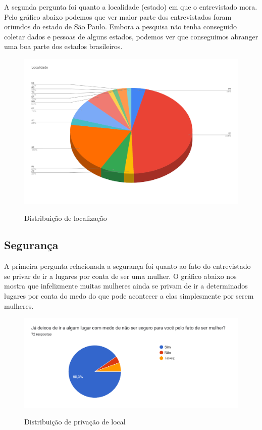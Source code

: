 A segunda pergunta foi quanto a localidade (estado) em que o entrevistado mora. Pelo gráfico abaixo podemos que ver maior parte dos entrevistados foram oriundos do estado de São Paulo. Embora a pesquisa não tenha conseguido coletar dados e pessoas de alguns estados, podemos ver que conseguimos abranger uma boa parte dos estados brasileiros.

\begin{figure}[htbp]
  \begin{center}
  \includegraphics[width=1.0\linewidth]{images/distribuicao-estados.png}\\
  \end{center}
  \caption[Distribuição de localização]{Distribuição de localização}
  \label{fig:mapa-empatia=inicial}
\end{figure}

\subsection{Segurança}
A primeira pergunta relacionada a segurança foi quanto ao fato do entrevistado se privar de ir a lugares por conta de ser uma mulher. O gráfico abaixo nos mostra que infelizmente muitas mulheres ainda se privam de ir a determinados lugares por conta do medo do que pode acontecer a elas simplesmente por serem mulheres. 
\begin{figure}[h]
  \begin{center}
  \includegraphics[width=1.0\linewidth]{images/distribuicao-privacao-mulher.png}\\
  \end{center}
  \caption[Distribuição de privação de local]{Distribuição de privação de local}
  \label{fig:mapa-empatia=inicial}
\end{figure}

